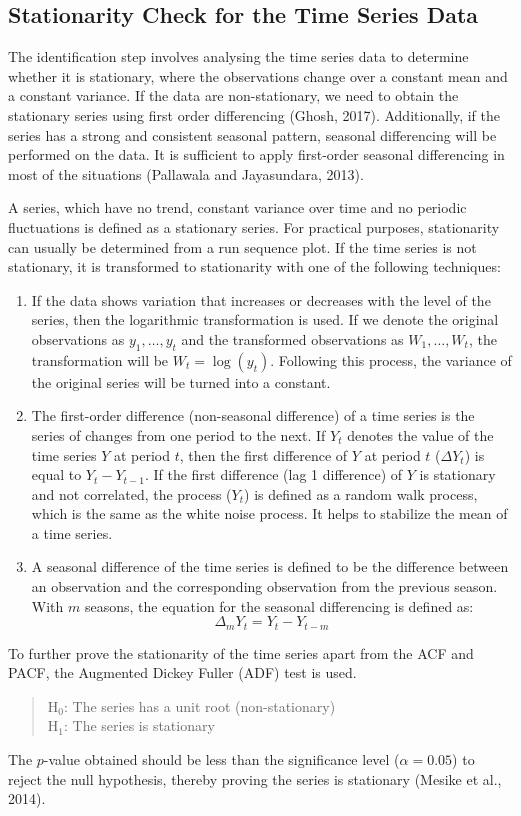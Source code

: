 \documentclass[12pt,a4paper]{report} %
\begin{document}
\subsection{Stationarity Check for the Time Series Data}
The identification step involves analysing the time series data to determine whether it is stationary, where the observations change over a constant mean and a constant variance. If the data are non-stationary, we need to obtain the stationary series using first order differencing (Ghosh, 2017). Additionally, if the series has a strong and consistent seasonal pattern, seasonal differencing will be performed on the data. It is sufficient to apply first-order seasonal differencing in most of the situations (Pallawala and Jayasundara, 2013).

A series, which have no trend, constant variance over time and no periodic fluctuations is defined as a stationary series. For practical purposes, stationarity can usually be determined from a run sequence plot. If the time series is not stationary, it is transformed to stationarity with one of the following techniques:
\begin{enumerate}
	\item If the data shows variation that increases or decreases with the level of the series, then the logarithmic transformation is used. If we denote the original observations as $y_1, \ldots, y_t$ and the transformed observations as $W_1, \ldots, W_t$, the transformation will be $W_t = \log(y_t)$. Following this process, the variance of the original series will be turned into a constant.
	\item The first-order difference (non-seasonal difference) of a time series is the series of changes from one period to the next. If $Y_t$ denotes the value of the time series $Y$ at period $t$, then the first difference of $Y$ at period $t$ ($\Delta Y_t$) is equal to $Y_t - Y_{t-1}$. If the first difference (lag 1 difference) of $Y$ is stationary and not correlated, the process ($Y_t$) is defined as a random walk process, which is the same as the white noise process. It helps to stabilize the mean of a time series.
	\item A seasonal difference of the time series is defined to be the difference between an observation and the corresponding observation from the previous season. With $m$ seasons, the equation for the seasonal differencing is defined as:
	\[
	\Delta_m Y_t = Y_t - Y_{t-m}
	\]
\end{enumerate}

To further prove the stationarity of the time series apart from the ACF and PACF, the Augmented Dickey Fuller (ADF) test is used. 
	\begin{quote}
	H$_0$: The series has a unit root (non-stationary) \\
	H$_1$: The series is stationary
\end{quote}
 The $p$-value obtained should be less than the significance level ($\alpha = 0.05$) to reject the null hypothesis, thereby proving the series is stationary (Mesike et al., 2014).
\end{document}
